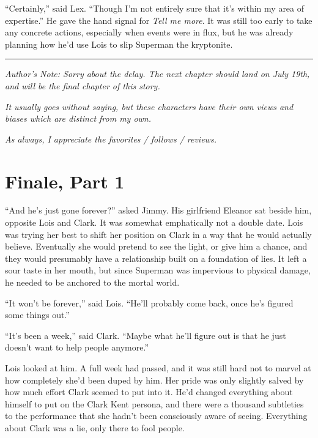 \documentclass[ebook,12pt]{memoir}
\begin{document}
``Certainly,'' said Lex. ``Though I'm not entirely sure that it's within
my area of expertise.'' He gave the hand signal for \emph{Tell me more}.
It was still too early to take any concrete actions, especially when
events were in flux, but he was already planning how he'd use Lois to
slip Superman the kryptonite.

\begin{center}\rule{0.5\linewidth}{0.5pt}\end{center}

\emph{Author's Note: Sorry about the delay. The next chapter should land
on July 19th, and will be the final chapter of this story.}

\emph{It usually goes without saying, but these characters have their
own views and biases which are distinct from my own.}

\emph{As always, I appreciate the favorites / follows / reviews.}



\hypertarget{finale-part-1}{%
\chapter{Finale, Part 1}\label{finale-part-1}}

``And he's just gone forever?'' asked Jimmy. His girlfriend Eleanor sat
beside him, opposite Lois and Clark. It was somewhat emphatically not a
double date. Lois was trying her best to shift her position on Clark in
a way that he would actually believe. Eventually she would pretend to
see the light, or give him a chance, and they would presumably have a
relationship built on a foundation of lies. It left a sour taste in her
mouth, but since Superman was impervious to physical damage, he needed
to be anchored to the mortal world.

``It won't be forever,'' said Lois. ``He'll probably come back, once
he's figured some things out.''

``It's been a week,'' said Clark. ``Maybe what he'll figure out is that
he just doesn't want to help people anymore.''

Lois looked at him. A full week had passed, and it was still hard not to
marvel at how completely she'd been duped by him. Her pride was only
slightly salved by how much effort Clark seemed to put into it. He'd
changed everything about himself to put on the Clark Kent persona, and
there were a thousand subtleties to the performance that she hadn't been
consciously aware of seeing. Everything about Clark was a lie, only
there to fool people.
\end{document}
